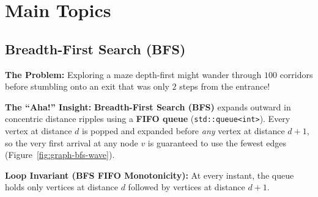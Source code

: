 \documentclass[11pt,a4paper]{article}
\theoremstyle{definition}
\newcommand{\painbeat}{\textbf{\color{accentamber}The Problem:} }
\newcommand{\ahabeat}{\textbf{\color{accentteal}The ``Aha!'' Insight:} }
\newcommand{\invariantbeat}[1]{\par\noindent\textbf{\color{accentteal}Loop Invariant (#1):} }
\begin{document}
\section{Main Topics}

\subsection{Breadth-First Search (BFS)}

\painbeat Exploring a maze depth-first might wander through $100$ corridors before stumbling onto an exit that was only $2$ steps from the entrance!

\ahabeat \textbf{Breadth-First Search (BFS)} expands outward in concentric distance ripples using a \textbf{FIFO queue} (\texttt{std::queue<int>}). Every vertex at distance $d$ is popped and expanded before \emph{any} vertex at distance $d + 1$, so the very first arrival at any node $v$ is guaranteed to use the fewest edges (Figure~\ref{fig:graph-bfs-wave}).

\invariantbeat{BFS FIFO Monotonicity} At every instant, the queue holds only vertices at distance $d$ followed by vertices at distance $d + 1$.
\end{document}
